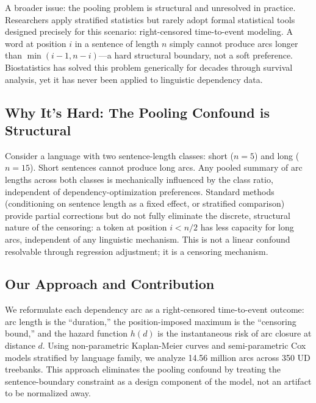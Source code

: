 \documentclass[11pt,letterpaper]{article}
\begin{document}
A broader issue: the pooling problem is structural and unresolved in practice. Researchers apply stratified statistics but rarely adopt formal statistical tools designed precisely for this scenario: right-censored time-to-event modeling. A word at position $i$ in a sentence of length $n$ simply cannot produce arcs longer than $\min(i-1, n-i)$---a hard structural boundary, not a soft preference. Biostatistics has solved this problem generically for decades through survival analysis, yet it has never been applied to linguistic dependency data.

\subsection{Why It's Hard: The Pooling Confound is Structural}

Consider a language with two sentence-length classes: short ($n=5$) and long ($n=15$). Short sentences cannot produce long arcs. Any pooled summary of arc lengths across both classes is mechanically influenced by the class ratio, independent of dependency-optimization preferences. Standard methods (conditioning on sentence length as a fixed effect, or stratified comparison) provide partial corrections but do not fully eliminate the discrete, structural nature of the censoring: a token at position $i < n/2$ has less capacity for long arcs, independent of any linguistic mechanism. This is not a linear confound resolvable through regression adjustment; it is a censoring mechanism.

\subsection{Our Approach and Contribution}

We reformulate each dependency arc as a right-censored time-to-event outcome: arc length is the ``duration,'' the position-imposed maximum is the ``censoring bound,'' and the hazard function $h(d)$ is the instantaneous risk of arc closure at distance $d$. Using non-parametric Kaplan-Meier curves and semi-parametric Cox models stratified by language family, we analyze 14.56 million arcs across 350 UD treebanks. This approach eliminates the pooling confound by treating the sentence-boundary constraint as a design component of the model, not an artifact to be normalized away.
\end{document}
